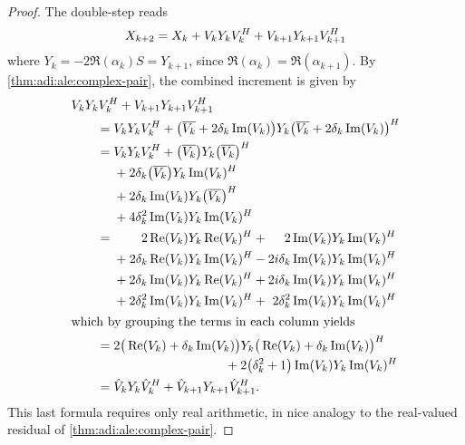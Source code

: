\begin{proof}
  The double-step reads
  \begin{equation*}
    X_{k+2} = X_k
    + V_k Y_k V_k^H
    + V_{k+1} Y_{k+1} V_{k+1}^H
  \end{equation*}
  where $Y_k = -2 \Re(\alpha_k) S = Y_{k+1}$,
  since $\Re(\alpha_k) = \Re(\alpha_{k+1})$.
  By \autoref{thm:adi:ale:complex-pair},
  the combined increment is given by
  \begin{align*}
    \MoveEqLeft
    V_k Y_k V_k^\HT + V_{k+1} Y_{k+1} V_{k+1}^\HT
    \\
    &= V_k Y_k V_k^\HT +
    \big( \conj{V_k} + 2\delta_k \Im(V_k) \big)
    Y_k
    \big( \conj{V_k} + 2\delta_k \Im(V_k) \big)^\HT
    \\
    &= \begin{aligned}[t]
      & V_k Y_k V_k^\HT + \big( \conj{V_k} \big) Y_k \big( \conj{V_k} \big)^\HT \\
      & + 2\delta_k \big( \conj{V_k} \big) Y_k \Im(V_k)^\HT \\
      & + 2\delta_k \Im(V_k) Y_k \big( \conj{V_k} \big)^\HT \\
      & + 4\delta_k^2 \Im(V_k) Y_k \Im(V_k)^\HT
    \end{aligned}
    \\
    &= \begin{alignedat}[t]{4}
      &&                 2 \Re(V_k) & Y_k \Re(V_k)^\HT &
      &{}+{}&            2 \Im(V_k) & Y_k \Im(V_k)^\HT
      \\
      &{}+{}&    2\delta_k \Re(V_k) & Y_k \Im(V_k)^\HT &
      &{}-{}& 2\im\delta_k \Im(V_k) & Y_k \Im(V_k)^\HT
      \\
      &{}+{}&    2\delta_k \Im(V_k) & Y_k \Re(V_k)^\HT &
      &{}+{}& 2\im\delta_k \Im(V_k) & Y_k \Im(V_k)^\HT
      \\
      &{}+{}&  2\delta_k^2 \Im(V_k) & Y_k \Im(V_k)^\HT &
      &{}+{}&  2\delta_k^2 \Im(V_k) & Y_k \Im(V_k)^\HT
    \end{alignedat}
    \\
\intertext{which by grouping the terms in each column yields}
    &= \begin{multlined}[t]
      2 \big( \Re(V_k) + \delta_k \Im(V_k) \big)
      Y_k \big( \Re(V_k) + \delta_k \Im(V_k) \big)^\HT
      \\
      + 2\big( \delta_k^2 + 1 \big) \Im(V_k) Y_k \Im(V_k)^\HT
    \end{multlined}
    \\
    &= \hat V_k Y_k \hat V_k^\HT
    + \hat V_{k+1} Y_{k+1} \hat V_{k+1}^\HT
    .
  \end{align*}
  This last formula requires only real arithmetic,
  in nice analogy to the real-valued residual of \autoref{thm:adi:ale:complex-pair}.
\end{proof}

